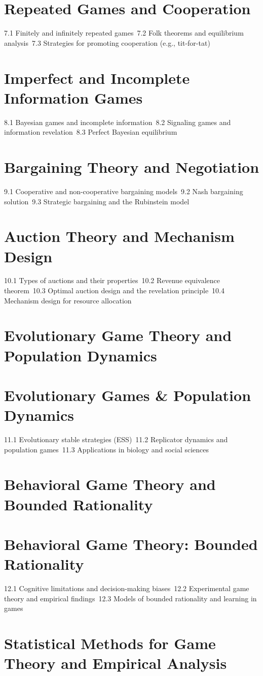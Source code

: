 \section{Repeated Games and Cooperation}
7.1 Finitely and infinitely repeated games\
7.2 Folk theorems and equilibrium analysis\
7.3 Strategies for promoting cooperation (e.g., tit-for-tat)\
\section{Imperfect and Incomplete Information Games}
8.1 Bayesian games and incomplete information\
8.2 Signaling games and information revelation\
8.3 Perfect Bayesian equilibrium\
\section{Bargaining Theory and Negotiation}
9.1 Cooperative and non-cooperative bargaining models\
9.2 Nash bargaining solution\
9.3 Strategic bargaining and the Rubinstein model\
\section{Auction Theory and Mechanism Design}
10.1 Types of auctions and their properties\
10.2 Revenue equivalence theorem\
10.3 Optimal auction design and the revelation principle\
10.4 Mechanism design for resource allocation\
\section{Evolutionary Game Theory and Population Dynamics}
\section{Evolutionary Games \& Population Dynamics}
11.1 Evolutionary stable strategies (ESS)\
11.2 Replicator dynamics and population games\
11.3 Applications in biology and social sciences\
\section{Behavioral Game Theory and Bounded Rationality}
\section{Behavioral Game Theory: Bounded Rationality}
12.1 Cognitive limitations and decision-making biases\
12.2 Experimental game theory and empirical findings\
12.3 Models of bounded rationality and learning in games\
\section{Statistical Methods for Game Theory and Empirical Analysis}
